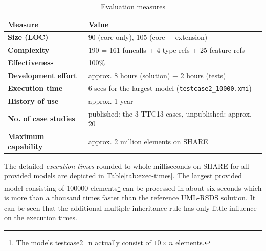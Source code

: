 \documentclass[submission]{eptcs}
\begin{document}
\begin{table}[htb]
  \centering
  \begin{tabular}{| l | l |}
    \hline
    \textbf{Measure}            & \textbf{Value}\\
    \hline
    \textbf{Size (LOC)}         & 90 (core only), 105 (core + extension)\\
    \textbf{Complexity}         & 190 = 161 funcalls + 4 type refs + 25 feature refs\\
    \textbf{Effectiveness}      & 100\%\\
    \textbf{Development effort} & approx. 8 hours (solution) + 2 hours (tests)\\
    \textbf{Execution time}     & 6 secs for the largest model (\verb|testcase2_10000.xmi|)\\
    \textbf{History of use}     & approx. 1 year\\
    \textbf{No. of case studies}& published: the 3 TTC13 cases, unpublished: approx. 20\\
    \textbf{Maximum capability} & approx. 2 million elements on SHARE\\
    \hline
  \end{tabular}
  \caption{Evaluation measures}
  \label{tab:evaluation}
\end{table}

The detailed \emph{execution times} rounded to whole milliseconds on SHARE for
all provided models are depicted in Table\ref{tab:exec-times}.  The largest
provided model consisting of 100000 elements\footnote{The models
  \textsf{testcase2\_n} actually consist of $10\times n$ elements.} can be
processed in about six seconds which is more than a thousand times faster than
the reference UML-RSDS solution.  It can be seen that the additional multiple
inheritance rule has only little influence on the execution times.
\end{document}
